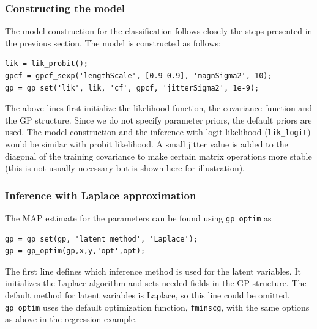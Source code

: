 \documentclass[twoside,11pt]{article}
\newcommand{\code}[1]{{\normalfont\texttt{#1}}}
\begin{document}
\subsubsection{Constructing the model}

The model construction for the classification follows closely the
steps presented in the previous section. The model is constructed
as follows:
%
\begin{verbatim}
lik = lik_probit();
gpcf = gpcf_sexp('lengthScale', [0.9 0.9], 'magnSigma2', 10);
gp = gp_set('lik', lik, 'cf', gpcf, 'jitterSigma2', 1e-9);
\end{verbatim}
%
The above lines first initialize the likelihood function, the
covariance function and the GP structure. Since we do not specify
parameter priors, the default priors are used. The model construction
and the inference with logit likelihood (\code{lik\_logit}) would be
similar with probit likelihood. A small jitter value is added to the
diagonal of the training covariance to make certain matrix operations
more stable (this is not usually necessary but is shown here for
illustration).

\subsubsection{Inference with Laplace approximation}\label{sec_classific_Laplace}

The MAP estimate for the parameters can be found using
\code{gp\_optim} as
%
\begin{verbatim}
gp = gp_set(gp, 'latent_method', 'Laplace');
gp = gp_optim(gp,x,y,'opt',opt);
\end{verbatim}
% 
The first line defines which inference method is used for the latent
variables. It initializes the Laplace algorithm and sets needed fields
in the GP structure. The default method for latent variables is
Laplace, so this line could be omitted.
%
\code{gp\_optim} uses the default optimization function,
\code{fminscg}, with the same options as above in the regression
example.
\end{document}
